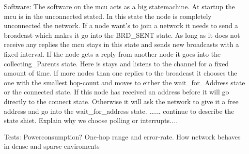 Software:
The software on the mcu acts as a big statemachine. At startup the mcu is in the unconnected stated. In this state the node is completely unconnected the network. If a node want's to join a network it needs to send a broadcast which makes it go into the BRD_SENT state. As long as it does not receive any replies the mcu stays in this state and sends new broadcasts with a fixed interval.
If the node gets a reply from another node it goes into the collecting_Parents state. Here is stays and listens to the channel for a fixed amount of time. If more nodes than one replies to the broadcast it chooses the one with the smallest hop-count and moves to either the wait_for_Address state or the connected state. 
If this node has received an address before it will go directly to the connect state. Otherwise it will ask the network to give it a free address and go into the wait_for_address state.
...... continue to describe the state shiet. Explain why we choose polling or interrupts.... 


Tests:
Powerconsumption?
One-hop range and error-rate.
How network behaves in dense and sparse enviroments
 
